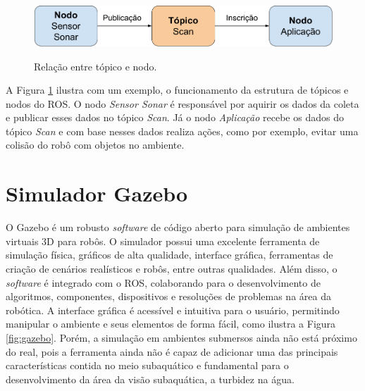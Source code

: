 \begin{figure}[H]
    \centering
    \caption{Relação entre tópico e nodo.}
    \includegraphics[scale=0.3]{dados/figuras/topic_node.png}
    \label{fig:topic_node}
\end{figure}

A Figura \ref{fig:topic_node} ilustra com um exemplo, o funcionamento da estrutura de tópicos e nodos do ROS. O nodo \textit{Sensor Sonar} é responsável por aquirir os dados da coleta e publicar esses dados no tópico \textit{Scan}. Já o nodo \textit{Aplicação} recebe os dados do tópico \textit{Scan} e com base nesses dados realiza ações, como por exemplo, evitar uma colisão do robô com objetos no ambiente.

\section{Simulador Gazebo}
\label{sec:gazebo}

O Gazebo é um robusto \textit{software} de código aberto para simulação de ambientes virtuais 3D para robôs. O simulador possui uma excelente ferramenta de simulação física, gráficos de alta qualidade, interface gráfica, ferramentas de criação de cenários realísticos e robôs, entre outras qualidades. Além disso, o \textit{software} é integrado com o ROS, colaborando para o desenvolvimento de algoritmos, componentes, dispositivos e resoluções de problemas na área da robótica. A interface gráfica é acessível e intuitiva para o usuário, permitindo manipular o ambiente e seus elementos de forma fácil, como ilustra a Figura \ref{fig:gazebo}. Porém, a simulação em ambientes submersos ainda não está próximo do real, pois a ferramenta ainda não é capaz de adicionar uma das principais características contida no meio subaquático e fundamental para o desenvolvimento da área da visão subaquática, a turbidez na água. 

